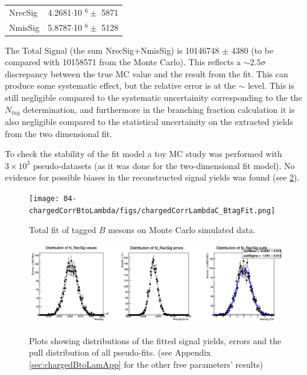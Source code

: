 \begin{tabular}{ |p{2.5cm}||p{4.2cm}|  }
 \hline
 NrecSig  & 4.2681$\cdot$10 $^6 \pm$ 5871\\
 NmisSig &  5.8787$\cdot$10 $^6 \pm$ 5128 \\
 \hline
\end{tabular}

\vspace{0.5 cm}
 The Total Signal (the sum  NrecSig+NmisSig) is 10146748 $\pm$ 4380 (to be compared with 10158571 from the Monte Carlo). This reflects a $\sim 2.5\sigma$ discrepancy between the true MC value and the result from the fit. This can produce some systematic effect, but the relative error is at the $\sim$ \textperthousand level. This is still negligible compared to the systematic uncertainity corresponding to the the ${N_{tag}}$ determination, and furthermore in the branching fraction calculation it is also negligible compared to the statistical uncertainity on the extracted yields from the two dimensional fit.
 
To check the stability of the fit model a toy MC study was performed with  $3\times10^3$ pseudo-datasets (as it was done for the two-dimensional fit model). No evidence for possible biases in the reconstructed signal yields was found (see \cref{fig:NrecSignalchargedCorrBtag_mcstudy}).

\begin{figure}[h!]
\centering
{\texttt{[image: 04-chargedCorrBtoLambda/figs/chargedCorrLambdaC\_BtagFit.png]}}
\caption{Total fit of tagged $B$ mesons on Monte Carlo simulated data.}
\label{fig:chargedCorrLambdaC_BtagFit}
\end{figure}
\vspace{1.5cm} 


  \begin{figure}[H]
\centering
{\centering\includegraphics[width=14cm]{04-chargedCorrBtoLambda/figs/NrecSigBtag_mcstudy.png}}
 \caption{Plots showing distributions of the fitted signal yields, errors and the pull distribution of
all pseudo-fits. (see Appendix \ref{sec:chargedBtoLamApp} for the other free parameters' results)}
  \label{fig:NrecSignalchargedCorrBtag_mcstudy}
  \end{figure}


